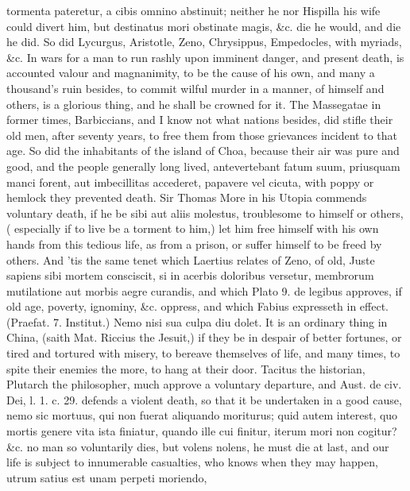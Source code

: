 tormenta pateretur, a cibis omnino abstinuit; neither he nor
Hispilla his wife could divert him, but destinatus mori obstinate
magis, \&c. die he would, and die he did. So did Lycurgus, Aristotle,
Zeno, Chrysippus, Empedocles, with myriads, \&c. In wars for a man to
run rashly upon imminent danger, and present death, is accounted valour
and magnanimity, to be the cause of his own, and many a
thousand's ruin besides, to commit wilful murder in a manner, of
himself and others, is a glorious thing, and he shall be crowned for
it. The  Massegatae in former times, Barbiccians, and I
know not what nations besides, did stifle their old men, after seventy
years, to free them from those grievances incident to that age. So did
the inhabitants of the island of Choa, because their air was pure and
good, and the people generally long lived, antevertebant fatum suum,
priusquam manci forent, aut imbecillitas accederet, papavere vel
cicuta, with poppy or hemlock they prevented death. Sir Thomas More in
his Utopia commends voluntary death, if he be sibi aut aliis molestus,
troublesome to himself or others, ( especially if to live be a
torment to him,) let him free himself with his own hands from this
tedious life, as from a prison, or suffer himself to be freed by
others. And 'tis the same tenet which Laertius relates of Zeno,
of old, Juste sapiens sibi mortem consciscit, si in acerbis doloribus
versetur, membrorum mutilatione aut morbis aegre curandis, and which
Plato 9. de legibus approves, if old age, poverty, ignominy, \&c.
oppress, and which Fabius expresseth in effect. (Praefat. 7. Institut.)
Nemo nisi sua culpa diu dolet. It is an ordinary thing in China, (saith
Mat. Riccius the Jesuit,) if they be in despair of better
fortunes, or tired and tortured with misery, to bereave themselves of
life, and many times, to spite their enemies the more, to hang at their
door. Tacitus the historian, Plutarch the philosopher, much approve a
voluntary departure, and Aust. de civ. Dei, l. 1. c. 29. defends a
violent death, so that it be undertaken in a good cause, nemo sic
mortuus, qui non fuerat aliquando moriturus; quid autem interest, quo
mortis genere vita ista finiatur, quando ille cui finitur, iterum mori
non cogitur? \&c. no man so voluntarily dies, but volens nolens,
he must die at last, and our life is subject to innumerable casualties,
who knows when they may happen, utrum satius est unam perpeti moriendo,
